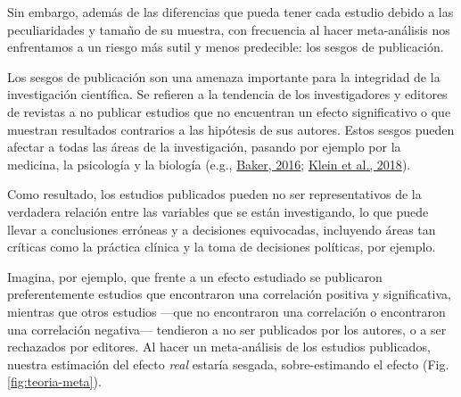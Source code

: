 \documentclass[
  bookmarksnumbered]{article}
\begin{document}
Sin embargo, además de las diferencias que pueda tener cada estudio debido a las peculiaridades y tamaño de su muestra, con frecuencia al hacer meta-análisis nos enfrentamos a un riesgo más sutil y menos predecible: los sesgos de publicación.

Los sesgos de publicación son una amenaza importante para la integridad de la investigación científica. Se refieren a la tendencia de los investigadores y editores de revistas a no publicar estudios que no encuentran un efecto significativo o que muestran resultados contrarios a las hipótesis de sus autores. Estos sesgos pueden afectar a todas las áreas de la investigación, pasando por ejemplo por la medicina, la psicología y la biología (e.g., \protect\hyperlink{ref-baker500ScientistsLift2016}{Baker, 2016}; \protect\hyperlink{ref-kleinManyLabsInvestigating2018}{Klein et al., 2018}).

Como resultado, los estudios publicados pueden no ser representativos de la verdadera relación entre las variables que se están investigando, lo que puede llevar a conclusiones erróneas y a decisiones equivocadas, incluyendo áreas tan críticas como la práctica clínica y la toma de decisiones políticas, por ejemplo.

Imagina, por ejemplo, que frente a un efecto estudiado se publicaron preferentemente estudios que encontraron una correlación positiva y significativa, mientras que otros estudios ---que no encontraron una correlación o encontraron una correlación negativa--- tendieron a no ser publicados por los autores, o a ser rechazados por editores. Al hacer un meta-análisis de los estudios publicados, nuestra estimación del efecto \emph{real} estaría sesgada, sobre-estimando el efecto (Fig. \ref{fig:teoria-meta}).
\end{document}
